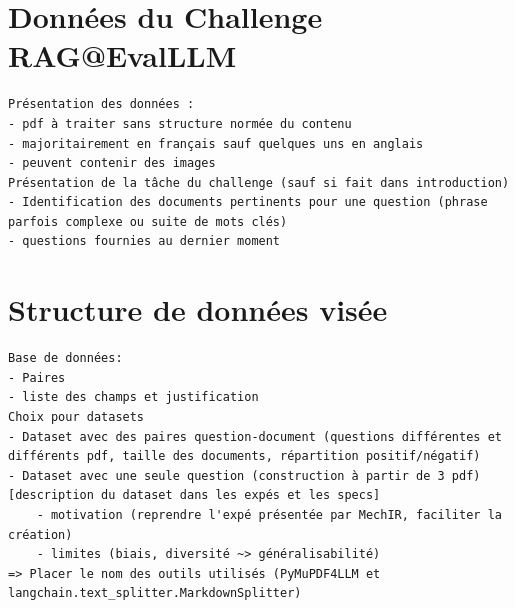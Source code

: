 \section{Données du Challenge RAG@EvalLLM}

    \begin{verbatim}
Présentation des données : 
- pdf à traiter sans structure normée du contenu
- majoritairement en français sauf quelques uns en anglais
- peuvent contenir des images
Présentation de la tâche du challenge (sauf si fait dans introduction)
- Identification des documents pertinents pour une question (phrase 
parfois complexe ou suite de mots clés) 
- questions fournies au dernier moment
    \end{verbatim}

\section{Structure de données visée}
    \begin{verbatim}
Base de données:        
- Paires 
- liste des champs et justification
Choix pour datasets
- Dataset avec des paires question-document (questions différentes et 
différents pdf, taille des documents, répartition positif/négatif)
- Dataset avec une seule question (construction à partir de 3 pdf) 
[description du dataset dans les expés et les specs]
    - motivation (reprendre l'expé présentée par MechIR, faciliter la création)
    - limites (biais, diversité ~> généralisabilité)
=> Placer le nom des outils utilisés (PyMuPDF4LLM et langchain.text_splitter.MarkdownSplitter)

    \end{verbatim}
